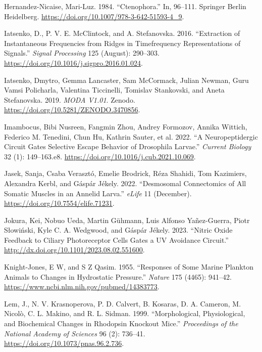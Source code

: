 \documentclass[
]{article}
\newlength{\cslhangindent}
\newlength{\cslentryspacingunit} %
\newenvironment{CSLReferences}[2] %
 {%
  \setlength{\parindent}{0pt}
  \ifodd #1
  \let\oldpar\par
  \def\par{\hangindent=\cslhangindent\oldpar}
  \fi
  \setlength{\parskip}{#2\cslentryspacingunit}
 }%
 {}
\begin{document}
\begin{CSLReferences}{1}{0}
\leavevmode{}%
Hernandez-Nicaise, Mari-Luz. 1984. {``Ctenophora.''} In, 96--111.
Springer Berlin Heidelberg.
\url{https://doi.org/10.1007/978-3-642-51593-4_9}.

\leavevmode{}%
Iatsenko, D., P. V. E. McClintock, and A. Stefanovska. 2016.
{``Extraction of Instantaneous Frequencies from Ridges in
Time{\textendash}frequency Representations of Signals.''} \emph{Signal
Processing} 125 (August): 290--303.
\url{https://doi.org/10.1016/j.sigpro.2016.01.024}.

\leavevmode{}%
Iatsenko, Dmytro, Gemma Lancaster, Sam McCormack, Julian Newman, Guru
Vamsi Policharla, Valentina Ticcinelli, Tomislav Stankovski, and Aneta
Stefanovska. 2019. \emph{MODA V1.01}. Zenodo.
\url{https://doi.org/10.5281/ZENODO.3470856}.

\leavevmode{}%
Imambocus, Bibi Nusreen, Fangmin Zhou, Andrey Formozov, Annika Wittich,
Federico M. Tenedini, Chun Hu, Kathrin Sauter, et al. 2022. {``A
Neuropeptidergic Circuit Gates Selective Escape Behavior of Drosophila
Larvae.''} \emph{Current Biology} 32 (1): 149--163.e8.
\url{https://doi.org/10.1016/j.cub.2021.10.069}.

\leavevmode{}%
Jasek, Sanja, Csaba Verasztó, Emelie Brodrick, Réza Shahidi, Tom
Kazimiers, Alexandra Kerbl, and Gáspár Jékely. 2022. {``Desmosomal
Connectomics of All Somatic Muscles in an Annelid Larva.''} \emph{eLife}
11 (December). \url{https://doi.org/10.7554/elife.71231}.

\leavevmode{}%
Jokura, Kei, Nobuo Ueda, Martin Gühmann, Luis Alfonso Yañez-Guerra,
Piotr Słowiński, Kyle C. A. Wedgwood, and Gáspár Jékely. 2023. {``Nitric
Oxide Feedback to Ciliary Photoreceptor Cells Gates a UV Avoidance
Circuit.''} \url{http://dx.doi.org/10.1101/2023.08.02.551600}.

\leavevmode{}%
Knight-Jones, E W, and S Z Qasim. 1955. {``Responses of Some Marine
Plankton Animals to Changes in Hydrostatic Pressure.''} \emph{Nature}
175 (4465): 941--42. \url{https://www.ncbi.nlm.nih.gov/pubmed/14383773}.

\leavevmode{}%
Lem, J., N. V. Krasnoperova, P. D. Calvert, B. Kosaras, D. A. Cameron,
M. Nicolò, C. L. Makino, and R. L. Sidman. 1999. {``Morphological,
Physiological, and Biochemical Changes in Rhodopsin Knockout Mice.''}
\emph{Proceedings of the National Academy of Sciences} 96 (2): 736--41.
\url{https://doi.org/10.1073/pnas.96.2.736}.


\end{CSLReferences}
\end{document}

